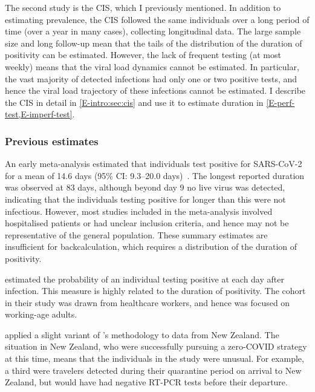 \documentclass[thesis.tex]{subfiles}
\begin{document}
The second study is the CIS, which I previously mentioned.
In addition to estimating prevalence, the CIS followed the same individuals over a long period of time (over a year in many cases), collecting longitudinal data.
The large sample size and long follow-up mean that the tails of the distribution of the duration of positivity can be estimated.
However, the lack of frequent testing (at most weekly) means that the viral load dynamics cannot be estimated.
In particular, the vast majority of detected infections had only one or two positive tests, and hence the viral load trajectory of these infections cannot be estimated.
I describe the CIS in detail in \cref{E-intro:sec:cis} and use it to estimate duration in \cref{E-perf-test,E-imperf-test}.


\subsubsection{Previous estimates}

An early meta-analysis estimated that individuals test positive for SARS-CoV-2 for a mean of 14.6 days (95\% CI: 9.3--20.0 days)~\autocite{cevikShedding}.
The longest reported duration was observed at 83 days, although beyond day 9 no live virus was detected, indicating that the individuals testing positive for longer than this were not infectious.
However, most studies included in the meta-analysis involved hospitalised patients or had unclear inclusion criteria, and hence may not be representative of the general population.
These summary estimates are insufficient for backcalculation, which requires a distribution of the duration of positivity.

\Textcite{hellewellPCRSensitivity} estimated the probability of an individual testing positive at each day after infection.
This measure is highly related to the duration of positivity.
The cohort in their study was drawn from healthcare workers, and hence was focused on working-age adults.

\Textcite{binnySensitivity} applied a slight variant of \textcite{hellewellPCRSensitivity}'s methodology to data from New Zealand.
The situation in New Zealand, who were successfully pursuing a zero-COVID strategy at this time, means that the individuals in the study were unusual.
For example, a third were travelers detected during their quarantine period on arrival to New Zealand, but would have had negative RT-PCR tests before their departure.
\end{document}
